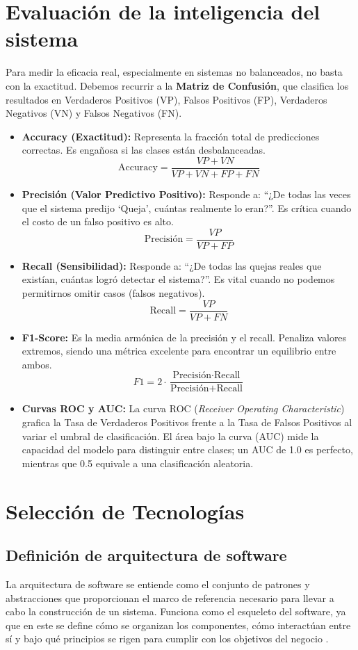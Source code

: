 \section{Evaluación de la inteligencia del sistema}
Para medir la eficacia real, especialmente en sistemas no balanceados, no basta con la exactitud. Debemos recurrir a la \textbf{Matriz de Confusión}, que clasifica los resultados en Verdaderos Positivos (VP), Falsos Positivos (FP), Verdaderos Negativos (VN) y Falsos Negativos (FN).
\begin{itemize}
\item \textbf{Accuracy (Exactitud):} Representa la fracción total de predicciones correctas. Es engañosa si las clases están desbalanceadas.
$$\text{Accuracy} = \frac{VP + VN}{VP + VN + FP + FN}$$
\item \textbf{Precisión (Valor Predictivo Positivo):} Responde a: “¿De todas las veces que el sistema predijo ‘Queja’, cuántas realmente lo eran?”. Es crítica cuando el costo de un falso positivo es alto.
$$\text{Precisión} = \frac{VP}{VP + FP}$$
\item \textbf{Recall (Sensibilidad):} Responde a: “¿De todas las quejas reales que existían, cuántas logró detectar el sistema?”. Es vital cuando no podemos permitirnos omitir casos (falsos negativos).
$$\text{Recall} = \frac{VP}{VP + FN}$$
\item \textbf{F1-Score:} Es la media armónica de la precisión y el recall. Penaliza valores extremos, siendo una métrica excelente para encontrar un equilibrio entre ambos.
$$F1 = 2 \cdot \frac{\text{Precisión} \cdot \text{Recall}}{\text{Precisión} + \text{Recall}}$$
\item \textbf{Curvas ROC y AUC:} La curva ROC (\textit{Receiver Operating Characteristic}) grafica la Tasa de Verdaderos Positivos frente a la Tasa de Falsos Positivos al variar el umbral de clasificación. El área bajo la curva (AUC) mide la capacidad del modelo para distinguir entre clases; un AUC de 1.0 es perfecto, mientras que 0.5 equivale a una clasificación aleatoria.
\end{itemize}

\section{Selección de Tecnologías}

\begin{flushleft}
\section{Definición de arquitectura de software}
\end{flushleft}
\justifying
La arquitectura de software se entiende como el conjunto de patrones y abstracciones que proporcionan el marco de referencia necesario para llevar a cabo la construcción de un sistema. Funciona como el esqueleto del software, ya que en este se define cómo se organizan los componentes, cómo interactúan entre sí y bajo qué principios se rigen para cumplir con los objetivos del negocio \cite{27}.
